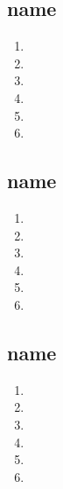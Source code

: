 \documentclass[11pt]{article}
\begin{document}
\newpage

\subsection{name}
\begin{enumerate}
\item 
\item 
\item 
\item 
\item 
\item 
\end{enumerate}

\newpage

\subsection{name}
\begin{enumerate}
\item 
\item 
\item 
\item 
\item 
\item 
\end{enumerate}

\newpage

\subsection{name}
\begin{enumerate}
\item 
\item 
\item 
\item 
\item 
\item 
\end{enumerate}

\newpage
\end{document}
